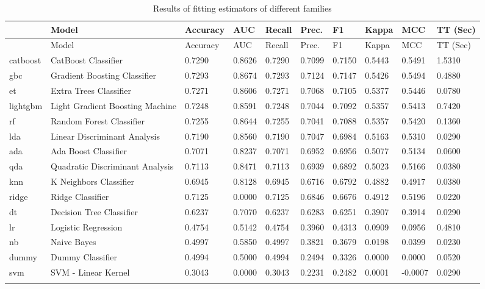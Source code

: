 \documentclass[
  letterpaper,
  DIV=11,
  numbers=noendperiod]{scrartcl}
\begin{document}
\hypertarget{tbl-leaderboard}{}
\begin{longtable}[]{@{}llllllllll@{}}
\toprule\noalign{}
~ & Model & Accuracy & AUC & Recall & Prec. & F1 & Kappa & MCC & TT
(Sec) \\
\midrule\noalign{}
\endfirsthead
\toprule\noalign{}
~ & Model & Accuracy & AUC & Recall & Prec. & F1 & Kappa & MCC & TT
(Sec) \\
\midrule\noalign{}
\endhead
\bottomrule\noalign{}
\endlastfoot
catboost & CatBoost Classifier & 0.7290 & 0.8626 & 0.7290 & 0.7099 &
0.7150 & 0.5443 & 0.5491 & 1.5310 \\
gbc & Gradient Boosting Classifier & 0.7293 & 0.8674 & 0.7293 & 0.7124 &
0.7147 & 0.5426 & 0.5494 & 0.4880 \\
et & Extra Trees Classifier & 0.7271 & 0.8606 & 0.7271 & 0.7068 & 0.7105
& 0.5377 & 0.5446 & 0.0780 \\
lightgbm & Light Gradient Boosting Machine & 0.7248 & 0.8591 & 0.7248 &
0.7044 & 0.7092 & 0.5357 & 0.5413 & 0.7420 \\
rf & Random Forest Classifier & 0.7255 & 0.8644 & 0.7255 & 0.7041 &
0.7088 & 0.5357 & 0.5420 & 0.1360 \\
lda & Linear Discriminant Analysis & 0.7190 & 0.8560 & 0.7190 & 0.7047 &
0.6984 & 0.5163 & 0.5310 & 0.0290 \\
ada & Ada Boost Classifier & 0.7071 & 0.8237 & 0.7071 & 0.6952 & 0.6956
& 0.5077 & 0.5134 & 0.0600 \\
qda & Quadratic Discriminant Analysis & 0.7113 & 0.8471 & 0.7113 &
0.6939 & 0.6892 & 0.5023 & 0.5166 & 0.0380 \\
knn & K Neighbors Classifier & 0.6945 & 0.8128 & 0.6945 & 0.6716 &
0.6792 & 0.4882 & 0.4917 & 0.0380 \\
ridge & Ridge Classifier & 0.7125 & 0.0000 & 0.7125 & 0.6846 & 0.6676 &
0.4912 & 0.5196 & 0.0220 \\
dt & Decision Tree Classifier & 0.6237 & 0.7070 & 0.6237 & 0.6283 &
0.6251 & 0.3907 & 0.3914 & 0.0290 \\
lr & Logistic Regression & 0.4754 & 0.5142 & 0.4754 & 0.3960 & 0.4313 &
0.0909 & 0.0956 & 0.4810 \\
nb & Naive Bayes & 0.4997 & 0.5850 & 0.4997 & 0.3821 & 0.3679 & 0.0198 &
0.0399 & 0.0230 \\
dummy & Dummy Classifier & 0.4994 & 0.5000 & 0.4994 & 0.2494 & 0.3326 &
0.0000 & 0.0000 & 0.0520 \\
svm & SVM - Linear Kernel & 0.3043 & 0.0000 & 0.3043 & 0.2231 & 0.2482 &
0.0001 & -0.0007 & 0.0290 \\
\caption{\label{tbl-leaderboard}Results of fitting estimators of
different families}\label{T_96c03}\tabularnewline
\end{longtable}
\end{document}
